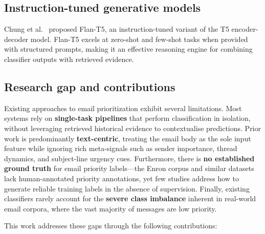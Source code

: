 \documentclass[3p,times,procedia]{elsarticle}
\begin{document}
\subsection{Instruction-tuned generative models}

Chung et al.~\cite{chung2022} proposed Flan-T5, an instruction-tuned variant of the T5 encoder-decoder model. Flan-T5 excels at zero-shot and few-shot tasks when provided with structured prompts, making it an effective reasoning engine for combining classifier outputs with retrieved evidence.

\subsection{Research gap and contributions}

Existing approaches to email prioritization exhibit several limitations. Most systems rely on \textbf{single-task pipelines} that perform classification in isolation, without leveraging retrieved historical evidence to contextualise predictions. Prior work is predominantly \textbf{text-centric}, treating the email body as the sole input feature while ignoring rich meta-signals such as sender importance, thread dynamics, and subject-line urgency cues. Furthermore, there is \textbf{no established ground truth} for email priority labels---the Enron corpus and similar datasets lack human-annotated priority annotations, yet few studies address how to generate reliable training labels in the absence of supervision. Finally, existing classifiers rarely account for the \textbf{severe class imbalance} inherent in real-world email corpora, where the vast majority of messages are low priority.

This work addresses these gaps through the following contributions:
\end{document}
